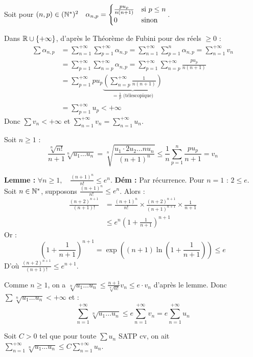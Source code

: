 \begin{solution}
Soit pour $(n,p) \in (\mathbb N^*)^2 \quad \alpha_{n,p} = \begin{cases} \frac{p u_p}{n(n+1)} & \text{si } p \leq n \\ 0 & \text{sinon} \end{cases}$.

Dans $\mathbb R \cup \{+\infty\}$, d'après le Théorème de Fubini pour des réels $\geq 0$ :
\begin{align*}
\sum \alpha_{n,p} &= \sum_{n=1}^{+\infty} \sum_{p=1}^{+\infty} \alpha_{n,p} = \sum_{n=1}^{+\infty} \sum_{p=1}^n \alpha_{n,p} = \sum_{n=1}^{+\infty} v_n \\
&= \sum_{p=1}^{+\infty} \sum_{n=p}^{+\infty} \alpha_{n,p} = \sum_{p=1}^{+\infty} \sum_{n=p}^{+\infty} \frac{p u_p}{n(n+1)} \\
&= \sum_{p=1}^{+\infty} p u_p \underbrace{\left( \sum_{n=p}^{+\infty} \frac{1}{n(n+1)} \right)}_{= \frac{1}{p} \text{ (télescopique)}} \\
&= \sum_{p=1}^{+\infty} u_p < +\infty
\end{align*}
Donc $\sum v_n < +\infty$ et $\sum_{n=1}^{+\infty} v_n = \sum_{n=1}^{+\infty} u_n$.

Soit $n \geq 1$ : 
\[ \frac{\sqrt[n]{n!}}{n+1} \sqrt[n]{u_1 \dots u_n} = \sqrt[n]{\frac{u_1 \cdot 2u_2 \dots n u_n}{(n+1)^n}} \leq \frac{1}{n} \sum_{p=1}^n \frac{p u_p}{n+1} = v_n \]

\textbf{Lemme :} $\forall n \geq 1, \quad \frac{(n+1)^n}{n!} \leq e^n$.
\textbf{Dém :} Par récurrence.
Pour $n=1$ : $2 \leq e$.
Soit $n \in \mathbb N^*$, supposons $\frac{(n+1)^n}{n!} \leq e^n$. Alors :
\begin{align*}
\frac{(n+2)^{n+1}}{(n+1)!} &= \frac{(n+1)^n}{n!} \times \frac{(n+2)^{n+1}}{(n+1)^{n+1}} \times \frac{1}{n+1} \\
&\leq e^n \left( 1 + \frac{1}{n+1} \right)^{n+1}
\end{align*}
Or :
\[ \left(1+\frac{1}{n+1}\right)^{n+1} = \exp\left((n+1)\ln\left(1+\frac{1}{n+1}\right)\right) \leq e \]
D'où $\frac{(n+2)^{n+1}}{(n+1)!} \leq e^{n+1}$.

Comme $n \geq 1$, on a $\sqrt[n]{u_1 \dots u_n} \leq \frac{n+1}{\sqrt[n]{n!}} v_n \leq e \cdot v_n$ d'après le lemme.
Donc $\sum \sqrt[n]{u_1 \dots u_n} < +\infty$ et :
\[ \sum_{n=1}^{+\infty} \sqrt[n]{u_1 \dots u_n} \leq e \sum_{n=1}^{+\infty} v_n = e \sum_{n=1}^{+\infty} u_n \]

Soit $C > 0$ tel que pour toute $\sum u_n$ SATP cv, on ait $\sum_{n=1}^{+\infty} \sqrt[n]{u_1 \dots u_n} \leq C \sum_{n=1}^{+\infty} u_n$.


\end{solution}
